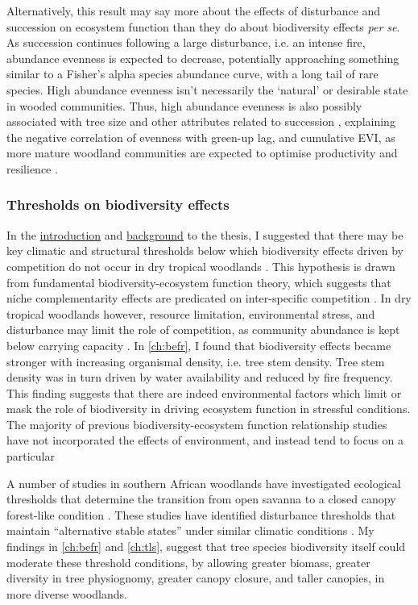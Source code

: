 \begin{refsection}
Alternatively, this result may say more about the effects of disturbance and succession on ecosystem function than they do about biodiversity effects \textit{per se}. As succession continues following a large disturbance, i.e. an intense fire, abundance evenness is expected to decrease, potentially approaching something similar to a Fisher's alpha species abundance curve, with a long tail of rare species. High abundance evenness isn't necessarily the `natural' or desirable state in wooded communities. Thus, high abundance evenness is also possibly associated with tree size and other attributes related to succession \citep{}, explaining the negative correlation of evenness with green-up lag, and cumulative EVI, as more mature woodland communities are expected to optimise productivity and resilience \citep{}.

\subsubsection{Thresholds on biodiversity effects}

In the \hyperref[ch:intro]{introduction} and \hyperref[ch:background]{background} to the thesis, I suggested that there may be key climatic and structural thresholds below which biodiversity effects driven by competition do not occur in dry tropical woodlands \citep{}. This hypothesis is drawn from fundamental biodiversity-ecosystem function theory, which suggests that niche complementarity effects are predicated on inter-specific competition \citep{}. In dry tropical woodlands however, resource limitation, environmental stress, and disturbance may limit the role of competition, as community abundance is kept below carrying capacity \citep{}. In \autoref{ch:befr}, I found that biodiversity effects became stronger with increasing organismal density, i.e. tree stem density. Tree stem density was in turn driven by water availability and reduced by fire frequency. This finding suggests that there are indeed environmental factors which limit or mask the role of biodiversity in driving ecosystem function in stressful conditions. The majority of previous biodiversity-ecosystem function relationship studies have not incorporated the effects of environment, and instead tend to focus on a particular 

A number of studies in southern African woodlands have investigated ecological thresholds that determine the transition from open savanna to a closed canopy forest-like condition \citep{}. These studies have identified disturbance thresholds that maintain ``alternative stable states'' under similar climatic conditions \citep{}. My findings in \autoref{ch:befr} and \autoref{ch:tls}, suggest that tree species biodiversity itself could moderate these threshold conditions, by allowing greater biomass, greater diversity in tree physiognomy, greater canopy closure, and taller canopies, in more diverse woodlands. 


\end{refsection}
